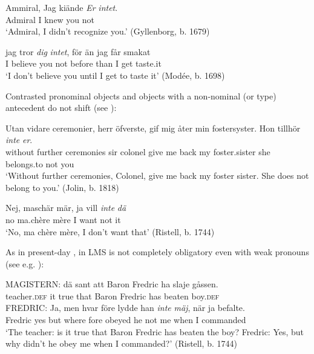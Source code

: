 \documentclass[output=paper]{langscibook}
\begin{document}
\ea\label{ex:intro:17}
\ea\label{ex:intro:17a}
\gll  Ammiral, Jag   kiände \textit{Er} \textit{intet}.\\
    Admiral   I       knew   you       not\\
    \glt ‘Admiral, I didn’t recognize you.’ (Gyllenborg, b. 1679)


\ex\label{ex:intro:17b}
\gll  jag tror \textit{dig} \textit{intet},   för     än   jag   får smakat \\
    I     believe you     not     before   than   I     get taste.it\\
    \glt ‘I don’t believe you until I get to taste it’ (Modée, b. 1698)
\z
\z


Contrasted pronominal objects and objects with a non-nominal (or type) antecedent do not shift (see \citealt{Andreasson2008}):


\ea\label{ex:intro:18}
\ea\label{ex:intro:18a}
\gll  Utan     vidare ceremonier,   herr   öfverste,   gif   mig   åter min fostersyster. Hon   tillhör \textit{inte} \textit{er}.\\
without   further ceremonies   sir   colonel     give me   back my foster.sister she   belongs.to   not   you\\
\glt ‘Without further ceremonies, Colonel, give me back my foster sister. She does not belong to you.’ (Jolin, b. 1818)


\ex\label{ex:intro:18b}
\gll  Nej, maschär   mär,   ja vill \textit{inte} \textit{dä}\\
      no    ma.chère   mère  I  want  not   it\\
 \glt       ‘No, ma chère   mère, I don’t want that’ (Ristell, b. 1744)
\z
\z


As in present-day ,  in LMS is not completely obligatory even with weak pronouns (see e.g. \citealt{Erteschik-ShirJosefsson2017}): 

\ea
\gll  MAGISTERN: dä     sant     att  Baron  Fredric  ha  slaje    gåssen. \\
  teacher\textsc{.def}  it  true   that  Baron  Fredric  has  beaten  boy.\textsc{def}\\

\gll  FREDRIC: Ja, men   hvar    före   lydde    han \textit{inte} \textit{mäj}, när      ja   befalte.\\
 Fredric    yes but   where  fore    obeyed   he    not  me   when    I   commanded\\
 
\glt ‘The teacher: is it true that Baron Fredric has beaten the boy? Fredric: Yes, but why didn’t he obey me when I commanded?’ (Ristell, b. 1744)
\z
\end{document}
